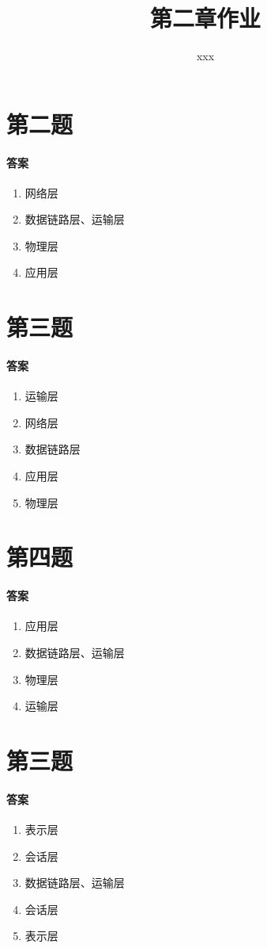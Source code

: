 \documentclass[UTF8]{article}
\title{第二章作业}
\author{xxx}
\begin{document}
\maketitle
\section{第二题}
\paragraph{答案}
\begin{enumerate}[a]
    \item 网络层
    \item 数据链路层、运输层
    \item 物理层
    \item 应用层
\end{enumerate}
\section{第三题}
\paragraph{答案}
\begin{enumerate}[a]
    \item 运输层
    \item 网络层
    \item 数据链路层
    \item 应用层
    \item 物理层
\end{enumerate}
\section{第四题}
\paragraph{答案}
\begin{enumerate}[a]
    \item 应用层
    \item 数据链路层、运输层
    \item 物理层
    \item 运输层
\end{enumerate}
\section{第三题}
\paragraph{答案}
\begin{enumerate}[a]
    \item 表示层
    \item 会话层
    \item 数据链路层、运输层
    \item 会话层
    \item 表示层
\end{enumerate}
\end{document}
